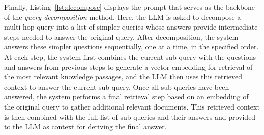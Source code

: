 \documentclass{article}
\begin{document}
Finally, Listing~\ref{lst:decompose} displays the prompt that serves as the backbone of the \emph{query-decomposition} method. Here, the LLM is asked to decompose a multi-hop query into a list of simpler queries whose answers provide intermediate steps needed to answer the original query. After decomposition, the system answers these simpler questions sequentially, one at a time, in the specified order.  At each step, the system first combines the current sub-query with the questions and answers from previous steps to generate a vector embedding for retrieval of the most relevant knowledge passages, and the LLM then uses this retrieved context to answer the current sub-query. Once all sub-queries have been answered, the system performs a final retrieval step based on an embedding of the original query to gather additional relevant documents. This retrieved context is then combined with the full list of sub-queries and their answers and provided to the LLM as context for deriving the final answer.
\end{document}
